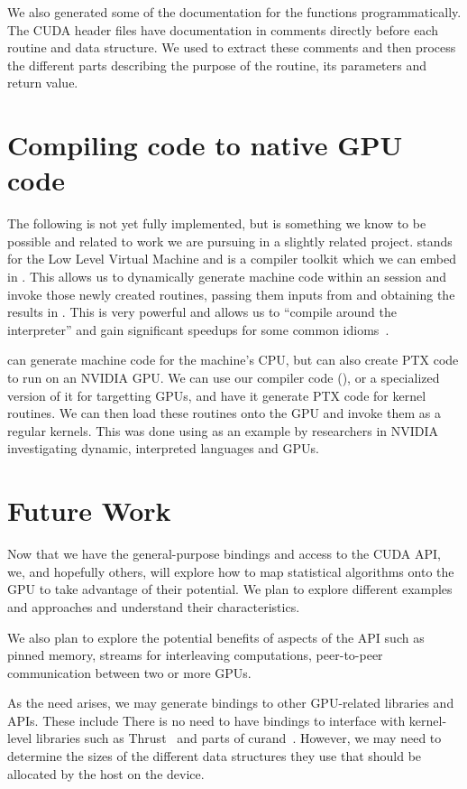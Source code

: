 \documentclass[article]{jss}
\def\R{\proglang{R}}
\def\llvm{\proglang{LLVM}}
\def\Rpkg#1{\pkg{#1}}
\begin{document}
We also generated some of the documentation for the \R{} functions
programmatically.  The CUDA header files have documentation in
comments directly before each routine and data structure.  We used
\Rpkg{RCIndex} to extract these comments and then process the
different parts describing the purpose of the routine, its parameters
and return value.



\section[Compiling R code to native GPU code]{Compiling \R{} code to native GPU code}\label{sec:LLVM}
The following is not yet fully implemented, but is something 
we know to be possible and related to work we are pursuing in a
slightly related project.
\llvm{} stands for the Low Level Virtual Machine
and is a compiler toolkit which we can embed in \R. 
This allows us to dynamically generate machine code within an \R{}
session and invoke those newly created routines, passing them 
inputs from \R{} and obtaining the results in \R.
This is very powerful and allows us to ``compile around the \R{}
interpreter'' and gain significant speedups for some common \R{}
idioms~\cite{bib:StatSciLLVM}.

\llvm{} can generate machine code for the machine's CPU, but can also
create PTX code to run on an NVIDIA GPU.  We can use our \R{} compiler
code (\Rpkg{RLLVMCompile}), or a specialized version of it for
targetting GPUs, and have it generate PTX code for kernel routines.
We can then load these routines onto the GPU and invoke them as a
regular kernels.  This was done using \R{} as an example by
researchers in NVIDIA~\cite{bib:libNVVM} investigating dynamic, interpreted
languages and GPUs.

\section{Future Work}

Now that we have the general-purpose bindings and access to the CUDA
API, we, and hopefully others, will explore how to map statistical
algorithms onto the GPU to take advantage of their potential.  We plan
to explore different examples and approaches and understand their
characteristics.  

We also plan to explore the potential benefits of aspects of the API
such as pinned memory, streams for interleaving computations,
peer-to-peer communication between two or more GPUs.

As the need arises, we may generate bindings to other GPU-related
libraries and APIs. These include There is no need to have \R{}
bindings to interface with kernel-level libraries such as
Thrust~\cite{bib:Thrust} and parts of curand~\cite{bib:curand}.
However, we may need to determine the sizes of the different data
structures they use that should be allocated by the host on the
device.



\end{document}
